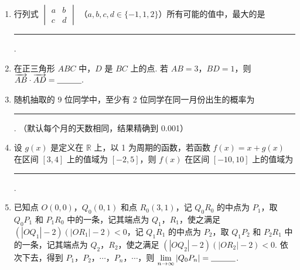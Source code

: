 \begin{description}
\begin{enumerate}[leftmargin=5pt]
请小牛同学计算 \( \xi \) 的数学期望，尽管“!”处无法完全看清，且两个“?”处字迹模糊，但能肯定这两个“?”处的数值相同. 据此，小牛给出了正确答案 \(E(\xi)=\)\rule[-0.3ex]{3em}{0.4pt}.

        \item 行列式 \(\begin{vmatrix}a & b\\ c & d \end{vmatrix}\) （\(a,b,c,d\in \{-1,1,2\}\)）所有可能的值中，最大的是\rule[-0.3ex]{3em}{0.4pt}.

        \item 在正三角形 \(ABC\) 中，\(D\) 是 \(BC\) 上的点. 若 \(AB = 3\)，\(BD = 1\)，则 \(\overrightarrow{AB} \cdot \overrightarrow{AD} =\rule[-0.3ex]{3em}{0.4pt}.\)

        \item 随机抽取的 9 位同学中，至少有 2 位同学在同一月份出生的概率为\rule[-0.3ex]{3em}{0.4pt}. （默认每个月的天数相同，结果精确到 0.001）

        \item 设 \(g(x)\) 是定义在 \(\mathbb{R}\) 上，以 1 为周期的函数，若函数 \(f(x) = x + g(x)\) 在区间 \([3,4]\) 上的值域为 \([-2,5]\)，则 \(f(x)\) 在区间 \([-10,10]\) 上的值域为\rule[-0.3ex]{3em}{0.4pt}.

        \item 已知点 \(O(0,0)\)，\(Q_0(0,1)\) 和点 \(R_0(3,1)\)，记 \(Q_0R_0\) 的中点为 \(P_1\)，取 \(Q_0P_1\) 和 \(P_1R_0\) 中的一条，记其端点为 \(Q_1\)，\(R_1\)，使之满足 \((|OQ_1| - 2)(|OR_1| - 2) < 0\)，记 \(Q_1R_1\) 的中点为 \(P_2\)，取 \(Q_1P_2\) 和 \(P_2R_1\) 中的一条，记其端点为 \(Q_2\)，\(R_2\)，使之满足 \((|OQ_2| - 2)(|OR_2| - 2) < 0\). 依次下去，得到 \(P_1\)，\(P_2\)，\(\cdots\)，\(P_n\)，\(\cdots\)，则 \(\lim\limits_{n \to \infty} \left|Q_0P_n\right| =\rule[-0.3ex]{3em}{0.4pt} \).

    \end{enumerate}

\end{description}

